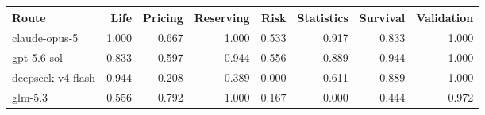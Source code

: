 \begin{tabular}{lrrrrrrr}
\toprule
Route & Life & Pricing & Reserving & Risk & Statistics & Survival & Validation \\
\midrule
claude-opus-5 & 1.000 & 0.667 & 1.000 & 0.533 & 0.917 & 0.833 & 1.000 \\
gpt-5.6-sol & 0.833 & 0.597 & 0.944 & 0.556 & 0.889 & 0.944 & 1.000 \\
deepseek-v4-flash & 0.944 & 0.208 & 0.389 & 0.000 & 0.611 & 0.889 & 1.000 \\
glm-5.3 & 0.556 & 0.792 & 1.000 & 0.167 & 0.000 & 0.444 & 0.972 \\
\bottomrule
\end{tabular}

